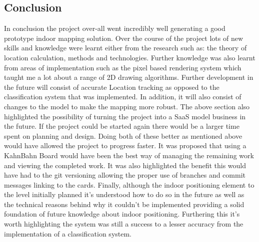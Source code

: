 \subsection{Conclusion}
In conclusion the project over-all went incredibly well generating a good prototype indoor mapping solution. Over the course of the project lots of new skills and knowledge were learnt either from the research such as: the theory of location calculation, methods and technologies. Further knowledge was also learnt from areas of implementation such as the pixel based rendering system which taught me a lot about a range of 2D drawing algorithms.
Further development in the future will consist of accurate Location tracking as opposed to the classification system that was implemented. In addition, it will also consist of changes to the model to make the mapping more robust. The above section also highlighted the possibility of turning the project into a SaaS model business in the future. If the project could be started again there would be a larger time spent on planning and design. Doing both of these better as mentioned above would have allowed the project to progress faster. It was proposed that using a KahnBahn Board would have been the best way of managing the remaining work and viewing the completed work. It was also highlighted the benefit this would have had to the git versioning allowing the proper use of branches and commit messages linking to the cards.
Finally, although the indoor positioning element to the level initially planned it's understood how to do so in the future as well as the technical reasons behind why it couldn't be implemented providing a solid foundation of future knowledge about indoor positioning. Furthering this it's worth highlighting the system was still a success to a lesser accuracy from the implementation of a classification system.
